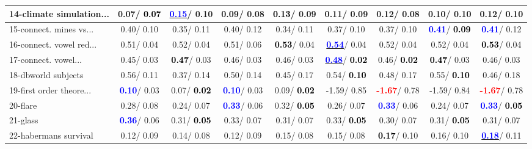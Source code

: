 \begin{table}[h]
\begin{center}
\begin{tabular}{lc|c|c|c|c|c|c|c}
14-climate simulation... &   0.07/\textcolor{black}{\textbf{  0.07}} & \underline{\textcolor{blue}{\textbf{  0.15}}}/  0.10 &   0.09/  0.08 & \textcolor{black}{\textbf{  0.13}}/  0.09 &   0.11/  0.09 &   0.12/  0.08 &   0.10/  0.10 &   0.12/  0.10 \\ \hline
15-connect. mines vs... &   0.40/  0.10 &   0.35/  0.11 &   0.40/  0.12 &   0.34/  0.11 &   0.37/  0.10 &   0.37/  0.10 & \textcolor{blue}{\textbf{  0.41}}/\textcolor{black}{\textbf{  0.09}} & \textcolor{blue}{\textbf{  0.41}}/  0.12 \\
16-connect. vowel red... &   0.51/  0.04 &   0.52/  0.04 &   0.51/  0.06 & \textcolor{black}{\textbf{  0.53}}/  0.04 & \underline{\textcolor{blue}{\textbf{  0.54}}}/  0.04 &   0.52/  0.04 &   0.52/  0.04 & \textcolor{black}{\textbf{  0.53}}/  0.04 \\
17-connect. vowel... &   0.45/  0.03 & \textcolor{black}{\textbf{  0.47}}/  0.03 &   0.46/  0.03 &   0.46/  0.03 & \underline{\textcolor{blue}{\textbf{  0.48}}}/\textcolor{black}{\textbf{  0.02}} &   0.46/\textcolor{black}{\textbf{  0.02}} & \textcolor{black}{\textbf{  0.47}}/  0.03 &   0.46/  0.03 \\
18-dbworld subjects &   0.56/  0.11 &   0.37/  0.14 &   0.50/  0.14 &   0.45/  0.17 &   0.54/\textcolor{black}{\textbf{  0.10}} &   0.48/  0.17 &   0.55/\textcolor{black}{\textbf{  0.10}} &   0.46/  0.18 \\
19-first order theore... & \textcolor{blue}{\textbf{  0.10}}/  0.03 &   0.07/\textcolor{black}{\textbf{  0.02}} & \textcolor{blue}{\textbf{  0.10}}/  0.03 &   0.09/\textcolor{black}{\textbf{  0.02}} &  -1.59/  0.85 & \textcolor{red}{\textbf{ -1.67}}/  0.78 &  -1.59/  0.84 & \textcolor{red}{\textbf{ -1.67}}/  0.78 \\
20-flare &   0.28/  0.08 &   0.24/  0.07 & \textcolor{blue}{\textbf{  0.33}}/  0.06 &   0.32/\textcolor{black}{\textbf{  0.05}} &   0.26/  0.07 & \textcolor{blue}{\textbf{  0.33}}/  0.06 &   0.24/  0.07 & \textcolor{blue}{\textbf{  0.33}}/\textcolor{black}{\textbf{  0.05}} \\
21-glass & \textcolor{blue}{\textbf{  0.36}}/  0.06 &   0.31/\textcolor{black}{\textbf{  0.05}} &   0.33/  0.07 &   0.31/  0.07 &   0.33/\textcolor{black}{\textbf{  0.05}} &   0.30/  0.07 &   0.31/\textcolor{black}{\textbf{  0.05}} &   0.31/  0.07 \\ \hline
22-habermans survival &   0.12/  0.09 &   0.14/  0.08 &   0.12/  0.09 &   0.15/  0.08 &   0.15/  0.08 & \textcolor{black}{\textbf{  0.17}}/  0.10 &   0.16/  0.10 & \underline{\textcolor{blue}{\textbf{  0.18}}}/  0.11 \\

\end{tabular}
\end{center}
\end{table}
